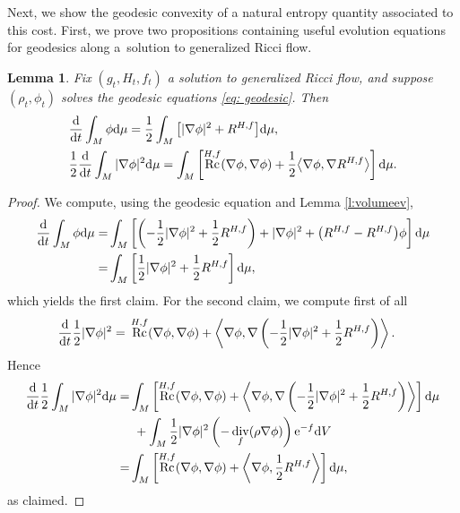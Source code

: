 \documentclass[11pt]{article}
\numberwithin{equation}{section}
\numberwithin{equation}{section}
\newtheorem{Lemma}[thm]{Lemma}
\newcommand{\N}{\nabla}
\newcommand{\IP}[1]{\left<#1\right>}
\DeclareMathOperator{\Rc}{Rc}
\DeclareMathOperator{\divg}{div}
\begin{document}
Next, we show the geodesic convexity of a natural entropy quantity associated to this cost. First, we prove two propositions containing useful evolution equations for geodesics along a~solution to generalized Ricci flow.

\begin{Lemma}\label{lem: evolution entropy 1} Fix $(g_t, H_t, f_t)$ a solution to generalized Ricci flow, and suppose $(\rho_t,\phi_t)$ solves the geodesic equations \eqref{eq: geodesic}. Then
	\begin{align*}
	&\frac{{\rm d}}{{\rm d}t}\int_M\phi {\rm d}\mu=\frac12\int_M\big[|\N \phi|^2+R^{H,f}\big] {\rm d}\mu,\\
&	\frac12	\frac{{\rm d}}{{\rm d}t}\int_M|\N\phi|^2 {\rm d}\mu=\int_M \left[\Rc^{H,f}(\N\phi,\N\phi) + \frac12\big\langle \N\phi,\N R^{H,f}\big\rangle\right] {\rm d}\mu.
	\end{align*}
\end{Lemma}

\begin{proof}
	We compute, using the geodesic equation and Lemma \ref{l:volumeev},
	\begin{align*}
	\frac{{\rm d}}{{\rm d}t}\int_M\phi {\rm d}\mu =&\int_M\left[\left(-\frac12|\N\phi|^2+\frac12 R^{H,f}\right)+|\N\phi|^2+\big(R^{H,f}-R^{H,f}\big)\phi\right] {\rm d}\mu\\
	=&\int_M\left[\frac12|\N\phi|^2+\frac12 R^{H,f}\right] {\rm d}\mu,
	\end{align*}
	which yields the first claim. For the second claim, we compute first of all
	\begin{align*}
	\frac{{\rm d}}{{\rm d}t}\frac12|\N\phi|^2={}&\Rc^{H,f}(\N\phi,\N\phi) +\IP{\N\phi,\N\left( -\frac12|\N\phi|^2+\frac12R^{H,f} \right)}.
	\end{align*}
	Hence
	\begin{align*}
	\frac{{\rm d}}{{\rm d}t}\frac12\int_M |\N\phi|^2 {\rm d}\mu=&\int_M \left[\Rc^{H,f}(\N\phi,\N\phi) +\IP{\N\phi,\N\left( -\frac12|\N\phi|^2+\frac12R^{H,f} \right)}\right] {\rm d}\mu\\
	&\ +\int_M \frac12|\N\phi|^2 \left(-\divg_f(\rho\N\phi) \right) {\rm e}^{-f} {\rm d}V\\
	=&\int_M \left[\Rc^{H,f}(\N\phi,\N\phi) +\IP{\N\phi,\frac12R^{H,f}}\right] {\rm d}\mu,
	\end{align*}
 as claimed.
\end{proof}
\end{document}
